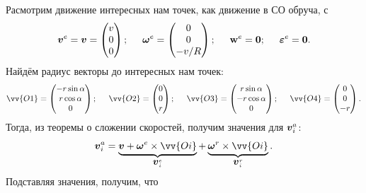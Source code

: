 Расмотрим движение интересных нам точек, как движение в СО обруча, с
$$
    \mbox{\boldmath $v$}^e = \mbox{\boldmath $v$} = \begin{pmatrix}
        v \\ 0\\ 0
    \end{pmatrix};
    \hspace{0.5cm} 
    \mbox{\boldmath $\omega$}^e = \begin{pmatrix}
        0 \\ 0 \\ - v / R
    \end{pmatrix};
    \hspace{0.5cm} \mbox{\boldmath $\mathrm{w}$}^e = \mbox{\boldmath $0$};
    \hspace{0.5cm} \mbox{\boldmath $\varepsilon$}^e = \mbox{\boldmath $0$}.
$$
Найдём радиус векторы до интересных нам точек:
$$
    \vv{O1} = \begin{pmatrix}
        -r \sin \alpha \\ r \cos \alpha \\ 0
    \end{pmatrix};
    \hspace{0.5cm} 
    \vv{O2} = \begin{pmatrix}
        0 \\ 0 \\ r
    \end{pmatrix};
    \hspace{0.5cm} 
    \vv{O3} = \begin{pmatrix}
        r \sin \alpha \\ -r \cos \alpha \\ 0
    \end{pmatrix};
    \hspace{0.5cm} 
    \vv{O4} = \begin{pmatrix}
        0 \\ 0 \\ -r
    \end{pmatrix}.
$$
Тогда, из теоремы о сложении скоростей, получим значения для $\mbox{\boldmath $v$}_i^a$:
$$
    \vc{v}_i^a = \underbrace{\vc{v} + \vc{\omega}^e \times \vv{Oi}}_{\vc{v}^e_i} + \underbrace{\vc{\omega}^r \times \vv{Oi}}_{\vc{v}^r_i}.
$$
Подставляя значения, получим, что
